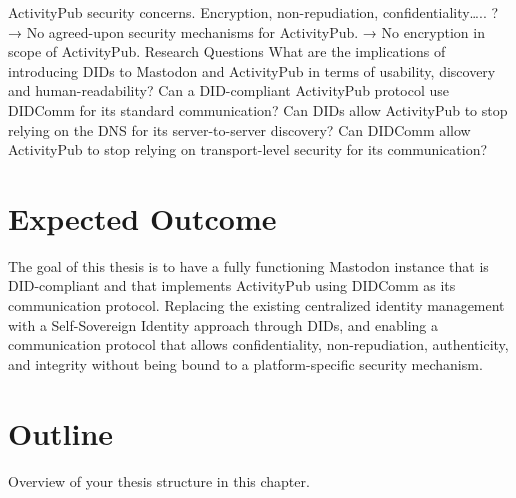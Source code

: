 ActivityPub security concerns. Encryption, non-repudiation, confidentiality….. ? 
→ No agreed-upon security mechanisms for ActivityPub. 
→ No encryption in scope of ActivityPub.
Research Questions
What are the implications of introducing DIDs to Mastodon and ActivityPub in terms of usability, discovery and human-readability?
Can a DID-compliant ActivityPub protocol use DIDComm for its standard communication?
Can DIDs allow ActivityPub to stop relying on the DNS for its server-to-server discovery?
Can DIDComm allow ActivityPub to stop relying on transport-level security for its communication?

\section{Expected Outcome}
The goal of this thesis is to have a fully functioning Mastodon instance that is DID-compliant and that implements ActivityPub using DIDComm as its communication protocol. 
Replacing the existing centralized identity management with a Self-Sovereign Identity approach through DIDs, and enabling a communication protocol that allows confidentiality, non-repudiation, authenticity, and integrity without being bound to a platform-specific security mechanism.
 
\section{Outline}
Overview of your thesis structure in this chapter.
